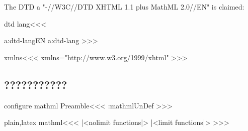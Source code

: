 The DTD 
a   "-//W3C//DTD XHTML 1.1 plus MathML 
2.0//EN" is claimed: 





\<dtd lang\><<<
\expandafter
\ifx \csname a:dtd-lang\endcsname\relax EN\else
  \csname a:dtd-lang\endcsname
\fi
>>>


\<xmlns\><<<
xmlns="http://www.w3.org/1999/xhtml"
>>>









\subsection{???????????}




\<configure mathml Preamble\><<<
\ifx \a:mathml\:UnDef
\fi 
\def\mml:class{\a:mathml class}
>>>


\<plain,latex mathml\><<<
|<nolimit functions|>
|<limit functions|>
>>>


